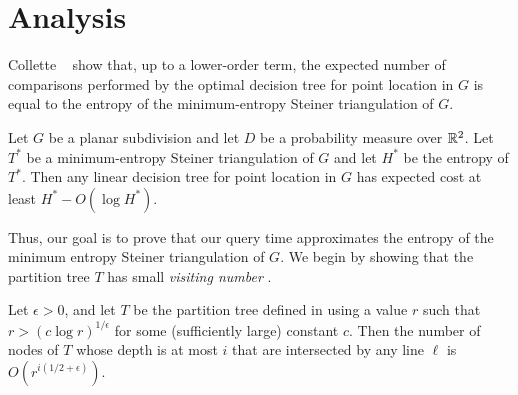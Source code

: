 \documentclass{patmorin}
\begin{document}
\section{Analysis}

Collette \etal\ \cite{cdilm08,cdilm09} show that, up to a lower-order
term, the expected number of comparisons performed by the optimal
decision tree for point location in $G$ is equal to the entropy of the
minimum-entropy Steiner triangulation of $G$.

\begin{thm}
Let $G$ be a planar subdivision and let $D$ be a probability measure
over $\mathbb{R}^2$.  Let $T^*$ be a  minimum-entropy Steiner triangulation of
$G$ and let $H^*$ be the entropy of $T^*$.  Then any linear decision tree
for point location in $G$ has expected cost at least $H^*-O(\log H^*)$.
\end{thm}

Thus, our goal is to prove that our query time approximates the entropy
of the minimum entropy Steiner triangulation of $G$.  We begin by showing
that the partition tree $T$ has small \emph{visiting number} \cite{hw87}.

\begin{lem}
  Let $\epsilon > 0$, and let $T$ be the partition tree defined
  in  using a value $r$ such that $r>(c\log
  r)^{1/\epsilon}$ for some (sufficiently large) constant $c$.  Then the
  number of nodes of $T$ whose depth is at most $i$ that are intersected
  by any line $\ell$ is $O(r^{i(1/2+\epsilon)})$.
\end{lem}
\end{document}
